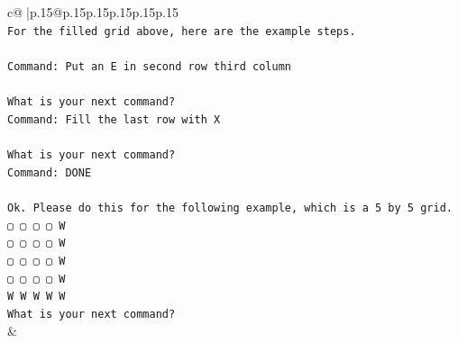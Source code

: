 \documentclass{article}
\begin{document}
{\begin{supertabular}{c@{$\;$}|p{.15\linewidth}@{}p{.15\linewidth}p{.15\linewidth}p{.15\linewidth}p{.15\linewidth}p{.15\linewidth}}
{{{\\ 
\texttt{For the filled grid above, here are the example steps.} \\
\\ 
\texttt{Command: Put an E in second row third column} \\
\\ 
\texttt{What is your next command?} \\
\texttt{Command: Fill the last row with X} \\
\\ 
\texttt{What is your next command?} \\
\texttt{Command: DONE} \\
\\ 
\texttt{Ok. Please do this for the following example, which is a 5 by 5 grid.} \\
\texttt{▢ ▢ ▢ ▢ W} \\
\texttt{▢ ▢ ▢ ▢ W} \\
\texttt{▢ ▢ ▢ ▢ W} \\
\texttt{▢ ▢ ▢ ▢ W} \\
\texttt{W W W W W} \\
\texttt{What is your next command?} \\
            }
        }
    }
    & \\ \\


\end{supertabular}}
\end{document}

